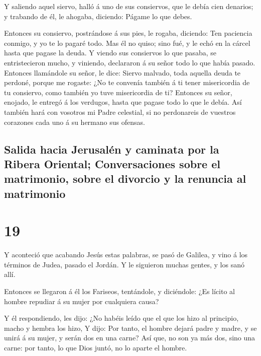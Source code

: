  Y saliendo aquel siervo, halló á uno de sus consiervos,
que le debía cien denarios; y trabando de él, le ahogaba, diciendo:
Págame lo que debes.

 Entonces su consiervo, postrándose á sus pies, le rogaba,
diciendo: Ten paciencia conmigo, y yo te lo pagaré todo. 
Mas él no quiso; sino fué, y le echó en la cárcel hasta que pagase la
deuda.  Y viendo sus consiervos lo que pasaba, se
entristecieron mucho, y viniendo, declararon á su señor todo lo que
había pasado.  Entonces llamándole su señor, le dice:
Siervo malvado, toda aquella deuda te perdoné, porque me rogaste:
 ¿No te convenía también á ti tener misericordia de tu
consiervo, como también yo tuve misericordia de ti? 
Entonces su señor, enojado, le entregó á los verdugos, hasta que pagase
todo lo que le debía.  Así también hará con vosotros mi
Padre celestial, si no perdonareis de vuestros corazones cada uno á su
hermano sus ofensas.

\hypertarget{salida-hacia-jerusaluxe9n-y-caminata-por-la-ribera-oriental-conversaciones-sobre-el-matrimonio-sobre-el-divorcio-y-la-renuncia-al-matrimonio}{%
\subsection{Salida hacia Jerusalén y caminata por la Ribera Oriental;
Conversaciones sobre el matrimonio, sobre el divorcio y la renuncia al
matrimonio}\label{salida-hacia-jerusaluxe9n-y-caminata-por-la-ribera-oriental-conversaciones-sobre-el-matrimonio-sobre-el-divorcio-y-la-renuncia-al-matrimonio}}

\hypertarget{section-18}{%
\section{19}\label{section-18}}

 Y aconteció que acabando Jesús estas palabras, se pasó de
Galilea, y vino á los términos de Judea, pasado el Jordán. 
Y le siguieron muchas gentes, y los sanó allí.

 Entonces se llegaron á él los Fariseos, tentándole, y
diciéndole: ¿Es lícito al hombre repudiar á su mujer por cualquiera
causa?

 Y él respondiendo, les dijo: ¿No habéis leído que el que
los hizo al principio, macho y hembra los hizo,  Y dijo: Por
tanto, el hombre dejará padre y madre, y se unirá á su mujer, y serán
dos en una carne?  Así que, no son ya más dos, sino una
carne: por tanto, lo que Dios juntó, no lo aparte el hombre.

